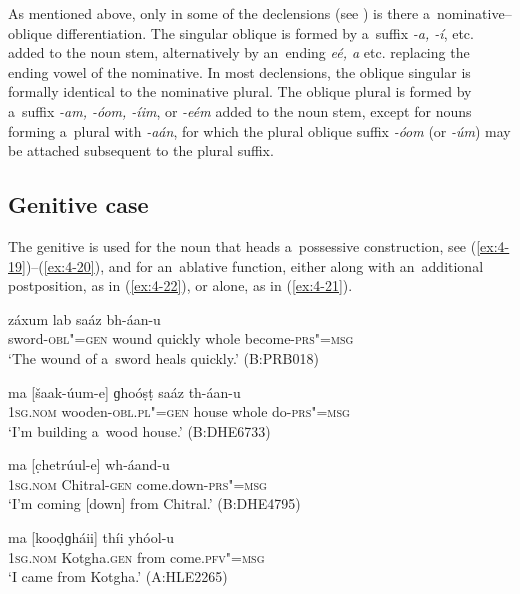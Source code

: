 As mentioned above, only in some of the declensions (see ) is there a~nominative--oblique differentiation. The singular oblique is formed by a~suffix \textit{-a, -í}, etc. added to the noun stem, alternatively by an~ending \textit{eé, a} etc. replacing the ending vowel of the nominative. In most declensions, the oblique singular is formally identical to the nominative plural. The oblique plural is formed by a~suffix \textit{-am, -óom, -íim}, or \textit{-eém} added to the noun stem, except for nouns forming a~plural with \textit{-aán}, for which the plural oblique suffix \textit{-óom} (or \textit{-úm}) may be attached subsequent to the plural suffix.

\subsection{Genitive case}
\label{subsec:4-5-3}

The genitive is used for the noun that heads a~possessive construction, see (\ref{ex:4-19})--(\ref{ex:4-20}), and for an~ablative function, either along with an~additional postposition, as in (\ref{ex:4-22}), or alone, as in (\ref{ex:4-21}).


\begin{exe}
\ex
\label{ex:4-19}
\gll [khanɡar-íi-e] záxum lab saáz bh-áan-u \\
	sword-\textsc{obl"=gen} wound quickly whole become-\textsc{prs"=msg} \\
\glt `The wound of a~sword heals quickly.' (B:PRB018)
\end{exe}

\begin{exe}
\ex
\label{ex:4-20}
\gll ma [šaak-úum-e] ɡhoóṣṭ saáz th-áan-u \\
	\textsc{1sg.nom} wooden-\textsc{obl.pl"=gen} house whole do-\textsc{prs"=msg} \\
\glt `I'm building a~wood house.' (B:DHE6733)
\end{exe}

\begin{exe}
\ex
\label{ex:4-21}
\gll ma [c̣hetrúul-e] wh-áand-u \\
	\textsc{1sg.nom} Chitral-\textsc{gen} come.down-\textsc{prs"=msg} \\
\glt `I'm coming [down] from Chitral.' (B:DHE4795)
\end{exe}

\begin{exe}
\ex
\label{ex:4-22}
\gll ma [kooḍɡháii] thíi yhóol-u \\
	\textsc{1sg.nom} Kotgha.\textsc{gen} from come.\textsc{pfv"=msg} \\
\glt `I came from Kotgha.' (A:HLE2265)
\end{exe}

